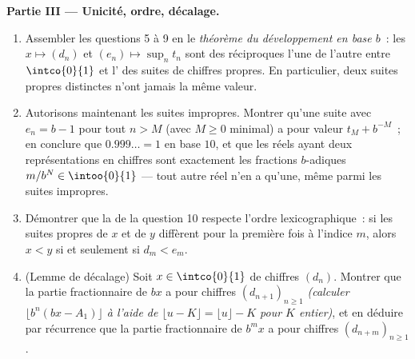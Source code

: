\begin{problem}
\medskip
\noindent\textbf{Partie III --- Unicité, ordre, décalage.}
\begin{enumerate}[resume]
  \item Assembler les questions 5 à 9 en le \emph{théorème du
        développement en base $b$}~: les  $x \mapsto
        (d_n)$ et $(e_n) \mapsto \sup_n t_n$ sont des 
        réciproques l'une de l'autre entre $\intco{0}{1}$ et
        l' des suites de chiffres propres. En particulier,
        deux suites propres distinctes n'ont jamais la même valeur.
  \item Autorisons maintenant les suites impropres. Montrer qu'une
        suite avec $e_n = b - 1$ pour tout $n > M$ (avec $M \geq 0$
        minimal) a pour valeur $t_M + b^{-M}$~; en conclure que
        $0.999\dots = 1$ en base $10$, et que les réels ayant deux
        représentations en chiffres sont exactement les fractions
        $b$-adiques $m/b^N \in \intoo{0}{1}$ --- tout autre réel
        n'en a qu'une, même parmi les suites impropres.
  \item Démontrer que la  de la question 10 respecte
        l'ordre lexicographique~: si les suites propres de $x$ et de
        $y$ diffèrent pour la première fois à l'indice $m$, alors
        $x < y$ si et seulement si $d_m < e_m$.
  \item (Lemme de décalage) Soit $x \in \intco{0}{1}$ de chiffres
        $(d_n)$. Montrer que la partie fractionnaire de $bx$ a pour
        chiffres $(d_{n+1})_{n \geq 1}$ \emph{(calculer $\lfloor
        b^n(bx - A_1)\rfloor$ à l'aide de $\lfloor u - K \rfloor =
        \lfloor u \rfloor - K$ pour $K$ entier)}, et en déduire par
        récurrence que la partie fractionnaire de $b^m x$ a pour
        chiffres $(d_{n+m})_{n \geq 1}$.
\end{enumerate}


\end{problem}
